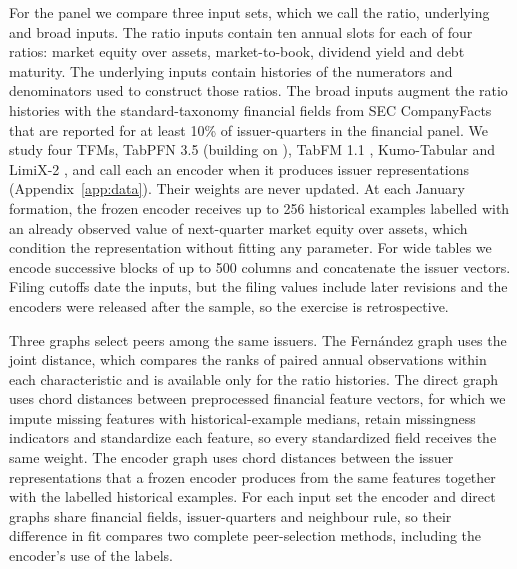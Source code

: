 For the panel we compare three input sets, which we call the ratio,
underlying and broad inputs. The ratio inputs contain ten annual slots for
each of four ratios: market equity over assets, market-to-book, dividend
yield and debt maturity. The underlying inputs contain histories of the
numerators and denominators used to construct those ratios. The broad
inputs augment the ratio histories with the standard-taxonomy financial
fields from SEC CompanyFacts that are reported for at least 10\% of
issuer-quarters in the financial panel. We study four TFMs, TabPFN 3.5
(building on \citealp{hollmann2025}), TabFM 1.1 \citep{kong2026tabfm},
Kumo-Tabular \citep{nvidia2026kumo} and LimiX-2 \citep{zhang2026limix},
and call each an encoder when it produces issuer representations
(Appendix~\ref{app:data}). Their weights are never updated. At each January
formation, the frozen encoder receives up to 256 historical examples
labelled with an already observed value of next-quarter market equity over
assets, which condition the representation without fitting any
parameter.
For wide tables we encode successive blocks of up to 500 columns and
concatenate the issuer vectors. Filing cutoffs date the inputs, but the
filing values include later revisions and the encoders were released after
the sample, so the exercise is retrospective.

Three graphs select peers among the same issuers. The Fern\'andez graph
uses the joint distance, which compares the ranks of paired annual
observations within each characteristic and is available only for the ratio
histories. The direct graph uses chord distances between preprocessed
financial feature vectors, for which we impute missing features with
historical-example medians, retain missingness indicators and standardize
each feature, so every standardized field receives the same weight. The
encoder graph uses chord distances between the issuer representations that
a frozen encoder produces from the same features together with the
labelled historical examples. For each input set the encoder and direct
graphs share financial fields, issuer-quarters and neighbour rule, so their
difference in fit compares two complete peer-selection methods, including
the encoder's use of the labels.

